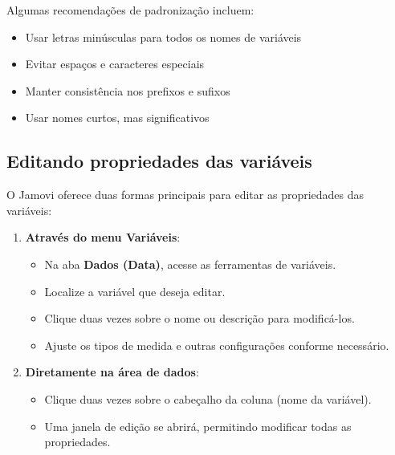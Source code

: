 Algumas recomendações de padronização incluem:
\begin{itemize}
    \item Usar letras minúsculas para todos os nomes de variáveis
    \item Evitar espaços e caracteres especiais
    \item Manter consistência nos prefixos e sufixos
    \item Usar nomes curtos, mas significativos
\end{itemize}

\subsection{Editando propriedades das variáveis}

O Jamovi oferece duas formas principais para editar as propriedades das variáveis:

\begin{enumerate}
    \item \textbf{Através do menu Variáveis}:
    \begin{itemize}
        \item Na aba \textbf{Dados (Data)}, acesse as ferramentas de variáveis.
        \item Localize a variável que deseja editar.
        \item Clique duas vezes sobre o nome ou descrição para modificá-los.
        \item Ajuste os tipos de medida e outras configurações conforme necessário.
    \end{itemize}
    
    \item \textbf{Diretamente na área de dados}:
    \begin{itemize}
        \item Clique duas vezes sobre o cabeçalho da coluna (nome da variável).
        \item Uma janela de edição se abrirá, permitindo modificar todas as propriedades.
    \end{itemize}
\end{enumerate}


